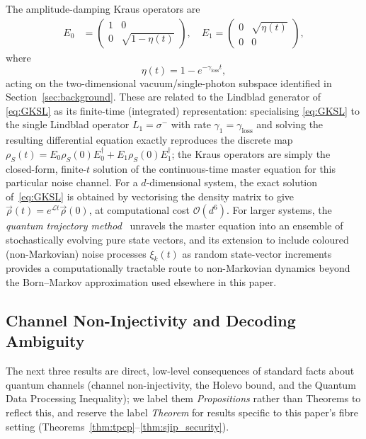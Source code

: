 \documentclass[journal,twocolumn]{IEEEtran}
\theoremstyle{definition}
\theoremstyle{plain}
\begin{document}
The amplitude-damping Kraus operators are
\begin{align}
  E_0 &= \begin{pmatrix}1 & 0 \\ 0 & \sqrt{1-\eta(t)}\end{pmatrix},
  \quad
  E_1 = \begin{pmatrix}0 & \sqrt{\eta(t)} \\ 0 & 0\end{pmatrix},
  \label{eq:kraus}
\end{align}
where
\begin{equation}
  \eta(t) = 1 - e^{-\gamma_{\mathrm{loss}} t},
  \label{eq:eta_t}
\end{equation}
acting on the two-dimensional vacuum/single-photon subspace
identified in Section~\ref{sec:background}. These are related to the
Lindblad generator of \eqref{eq:GKSL} as its finite-time
(integrated) representation: specialising \eqref{eq:GKSL} to the
single Lindblad operator $L_1=\sigma^-$ with rate
$\gamma_1=\gamma_{\mathrm{loss}}$ and solving the resulting
differential equation exactly reproduces the discrete map
$\rho_S(t) = E_0\rho_S(0)E_0^\dagger + E_1\rho_S(0)E_1^\dagger$; the
Kraus operators are simply the closed-form, finite-$t$ solution of
the continuous-time master equation for this particular noise
channel.  For a $d$-dimensional
system, the exact solution of~\eqref{eq:GKSL} is obtained by
vectorising the density matrix to give $\vec\rho(t) =
e^{\mathcal{L}t}\vec\rho(0)$, at computational cost
$\mathcal{O}(d^6)$.  For larger systems, the \emph{quantum
trajectory method}~\cite{dalibard1992,carmichael1993} unravels the
master equation into an ensemble of stochastically evolving pure
state vectors, and its extension to include coloured (non-Markovian)
noise processes $\xi_k(t)$ as random state-vector increments
provides a computationally tractable route to non-Markovian dynamics
beyond the Born--Markov approximation used elsewhere in this paper.

\subsection{Channel Non-Injectivity and Decoding Ambiguity}

The next three results are direct, low-level consequences of
standard facts about quantum channels (channel non-injectivity, the
Holevo bound, and the Quantum Data Processing Inequality); we label
them \emph{Propositions} rather than Theorems to reflect this, and
reserve the label \emph{Theorem} for results specific to this
paper's fibre setting (Theorems~\ref{thm:tpcp}--\ref{thm:sjip_security}).
\end{document}
